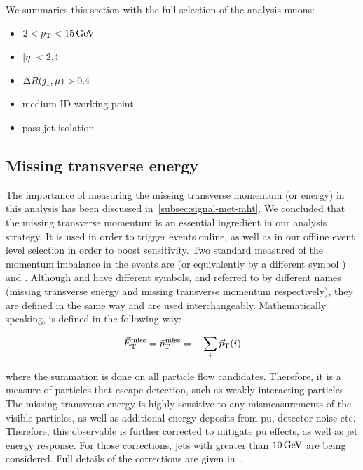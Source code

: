 We summaries this section with the full selection of the analysis muons:
\begin{itemize}
\item $2<p_{\mathrm{T}}<15\,\text{Ge\hspace{-.08em}V}$
\item $\lvert \eta \rvert < 2.4$
\item $\Delta R(\jmath_1,\mu)>0.4$
\item medium ID working point
\item pass jet-isolation
\end{itemize}



\clearpage

\subsection{Missing transverse energy}
\label{subsec:met}

The importance of measuring the missing transverse momentum (or energy) in this analysis has been discussed in~\ref{subsec:signal-met-mht}. We concluded that the missing transverse momentum is an essential ingredient in our analysis strategy. It is used in order to trigger events online, as well as in our offline event level selection in order to boost sensitivity. Two standard measured of the momentum imbalance in the events are \VEtmiss (or equivalently by a different symbol \ptvecmiss) and \htvecmiss. Although \VEtmiss and \ptvecmiss have different symbols, and referred to by different names (missing transverse energy and missing transverse momentum respectively), they are defined in the same way and are used interchangeably. Mathematically speaking, \VEtmiss is defined in the following way:

\begin{equation}
{\vec E}_{\mathrm{T}}^{\text{miss}} = {\vec p}_{\mathrm{T}}^{\kern1pt\text{miss}} = -\sum_i {\vec p}_{\mathrm{T}}(i)
\end{equation}

where the summation is done on all particle flow candidates. Therefore, it is a measure of particles that escape detection, such as weakly interacting particles. The missing transverse energy is highly sensitive to any mismeasurements of the visible
particles, as well as additional energy deposits from \gls{pu}, detector noise etc. Therefore, this observable is further corrected to mitigate \gls{pu} effects, as well as jet energy response. For those corrections, jets with \pt greater than $10\,\text{Ge\hspace{-.08em}V}$ are being considered. Full details of the corrections are given in~\cite{met_performance}.

